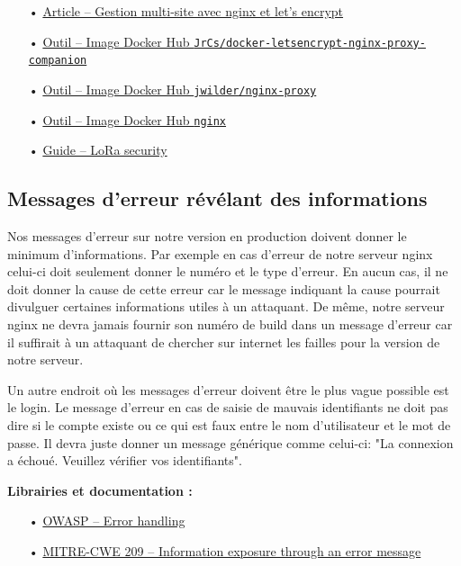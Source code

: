 \documentclass[12pt]{article}
\begin{document}
\begin{itemize}
\item[•] \href{https://meta.discourse.org/t/help-multisite-with-letsencrypt-nginx-proxy-companion/88192}{Article -- Gestion multi-site avec nginx et let's encrypt}
\item[•] \href{https://github.com/JrCs/docker-letsencrypt-nginx-proxy-companion}{Outil -- Image Docker Hub \texttt{JrCs/docker-letsencrypt-nginx-proxy-companion}}
\item[•] \href{https://github.com/jwilder/nginx-proxy}{Outil -- Image Docker Hub \texttt{jwilder/nginx-proxy}}
\item[•] \href{https://hub.docker.com/_/nginx/}{Outil -- Image Docker Hub \texttt{nginx}}
\item[•] \href{https://labs.mwrinfosecurity.com/assets/BlogFiles/mwri-LoRa-security-guide-1.2-2016-03-22.pdf}{Guide -- LoRa security}
\end{itemize}

\subsection{Messages d'erreur révélant des informations}
\label{ssec:cm-messageserreurs}

Nos messages d'erreur sur notre version en production doivent donner le minimum d'informations. Par exemple en cas d'erreur de notre serveur nginx celui-ci doit seulement donner le numéro et le type d'erreur. En aucun cas, il ne doit donner la cause de cette erreur car le message indiquant la cause pourrait divulguer certaines informations utiles à un attaquant. De même, notre serveur nginx ne devra jamais fournir son numéro de build dans un message d'erreur car il suffirait à un attaquant de chercher sur internet les failles pour la version de notre serveur.

Un autre endroit où les messages d'erreur doivent être le plus vague possible est le login. Le message d'erreur en cas de saisie de mauvais identifiants ne doit pas dire si le compte existe ou ce qui est faux entre le nom d'utilisateur et le mot de passe. Il devra juste donner un message générique comme celui-ci: "La connexion a échoué. Veuillez vérifier vos identifiants".

\medskip
\textbf{Librairies et documentation :}

\begin{itemize}
\item[•] \href{https://www.owasp.org/index.php/Error_Handling}{OWASP -- Error handling}
\item[•] \href{https://cwe.mitre.org/data/definitions/209.html}{MITRE-CWE 209 -- Information exposure through an error message}
\end{itemize}
\end{document}

